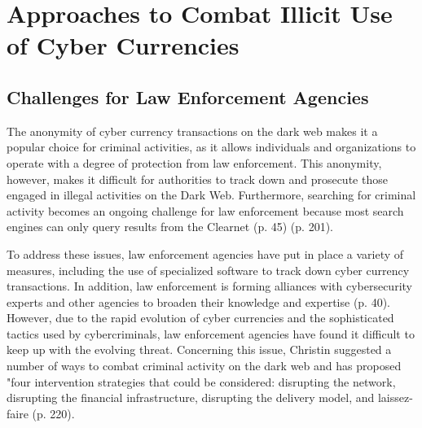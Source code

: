 \chapter{Approaches to Combat Illicit Use of Cyber Currencies}

\section{Challenges for Law Enforcement Agencies}

The anonymity of cyber currency transactions on the dark web makes it a popular choice for criminal activities, as it allows individuals and organizations to operate with a degree of protection from law enforcement. This anonymity, however, makes it difficult for authorities to track down and prosecute those engaged in illegal activities on the Dark Web. Furthermore, searching for criminal activity becomes an ongoing challenge for law enforcement because most search engines can only query results from the Clearnet \cite{lacson_21st_2016} (p. 45) \cite{zheng_learning_2013} (p. 201). 

To address these issues, law enforcement agencies have put in place a variety of measures, including the use of specialized software to track down cyber currency transactions. In addition, law enforcement is forming alliances with cybersecurity experts and other agencies to broaden their knowledge and expertise \cite{europol_internet_2017} (p. 40). However, due to the rapid evolution of cyber currencies and the sophisticated tactics used by cybercriminals, law enforcement agencies have found it difficult to keep up with the evolving threat. Concerning this issue, Christin suggested a number of ways to combat criminal activity on the dark web and has proposed "four intervention strategies that could be considered: disrupting the network, disrupting the financial infrastructure, disrupting the delivery model, and laissez-faire \cite{christin_traveling_2013} (p. 220).

